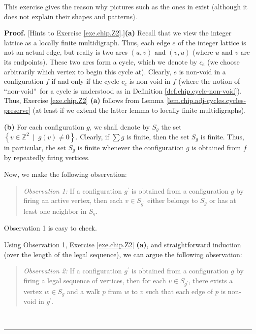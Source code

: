 \documentclass[numbers=enddot,12pt,final,onecolumn,notitlepage]{scrartcl}%
\newcounter{exer}
\theoremstyle{definition}
\newenvironment{statement}{\begin{quote}}{\end{quote}}
\newenvironment{proof}[1][Proof]{\noindent\textbf{#1.} }{\ \rule{0.5em}{0.5em}}
\let\sumnonlimits\sum
\renewcommand{\sum}{\sumnonlimits\limits}
\begin{document}
This exercise gives the reason why pictures such as the
ones in \cite{Ellenb15} exist (although it does not
explain their shapes and patterns).

\begin{proof}
[Hints to Exercise \ref{exe.chip.Z2}.]\textbf{(a)} Recall that we view the
integer lattice as a locally finite multidigraph. Thus, each edge $e$ of the
integer lattice is not an actual edge, but really is two arcs $\left(
u,v\right)  $ and $\left(  v,u\right)  $ (where $u$ and $v$ are its
endpoints). These two arcs form a cycle, which we denote by $c_{e}$ (we choose
arbitrarily which vertex to begin this cycle at). Clearly, $e$ is non-void in
a configuration $f$ if and only if the cycle $c_{e}$ is non-void in $f$ (where
the notion of \textquotedblleft non-void\textquotedblright\ for a cycle is
understood as in Definition \ref{def.chip.cycle-non-void}). Thus, Exercise
\ref{exe.chip.Z2} \textbf{(a)} follows from Lemma
\ref{lem.chip.adj-cycles.cycles-preserve} (at least if we extend the latter
lemma to locally finite multidigraphs).

\textbf{(b)} For each configuration $g$, we shall denote by $S_{g}$ the set
$\left\{  v\in\mathbb{Z}^{2}\ \mid\ g\left(  v\right)  \neq0\right\}  $.
Clearly, if $\sum g$ is finite, then the set $S_{g}$ is finite. Thus, in
particular, the set $S_{g}$ is finite whenever the configuration $g$ is
obtained from $f$ by repeatedly firing vertices.

Now, we make the following observation:

\begin{statement}
\textit{Observation 1:} If a configuration $g^{\prime}$ is obtained from a
configuration $g$ by firing an active vertex, then each $v\in S_{g^{\prime}}$
either belongs to $S_{g}$ or has at least one neighbor in $S_{g}$.
\end{statement}

Observation 1 is easy to check.

Using Observation 1, Exercise \ref{exe.chip.Z2} \textbf{(a)}, and
straightforward induction (over the length of the legal sequence), we can
argue the following observation:

\begin{statement}
\textit{Observation 2:} If a configuration $g^{\prime}$ is obtained from a
configuration $g$ by firing a legal sequence of vertices, then for each $v\in
S_{g^{\prime}}$, there exists a vertex $w\in S_{g}$ and a walk $p$ from $w$ to
$v$ such that each edge of $p$ is non-void in $g^{\prime}$.
\end{statement}


\end{proof}
\end{document}
